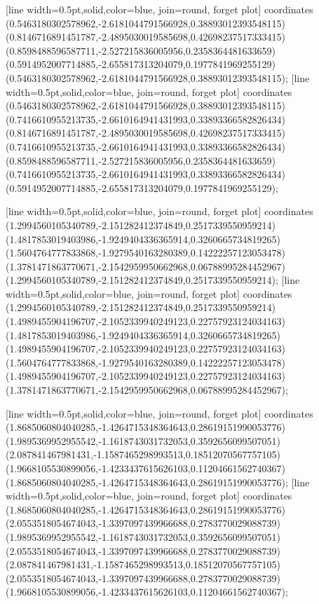 [line width=0.5pt,solid,color=blue, join=round, forget plot] coordinates {(0.5463180302578962,-2.6181044791566928,0.38893012393548115) (0.8146716891451787,-2.4895030019585698,0.42698237517333415) (0.8598488596587711,-2.527215836005956,0.2358364481633659) (0.5914952007714885,-2.655817313204079,0.1977841969255129) (0.5463180302578962,-2.6181044791566928,0.38893012393548115)};
[line width=0.5pt,solid,color=blue, join=round, forget plot] coordinates {(0.5463180302578962,-2.6181044791566928,0.38893012393548115) (0.7416610955213735,-2.6610164941431993,0.33893366582826434) (0.8146716891451787,-2.4895030019585698,0.42698237517333415) (0.7416610955213735,-2.6610164941431993,0.33893366582826434) (0.8598488596587711,-2.527215836005956,0.2358364481633659) (0.7416610955213735,-2.6610164941431993,0.33893366582826434) (0.5914952007714885,-2.655817313204079,0.1977841969255129)};

[line width=0.5pt,solid,color=blue, join=round, forget plot] coordinates {(1.2994560105340789,-2.151282412374849,0.2517339550959214) (1.4817853019403986,-1.9249404336365914,0.3260665734819265) (1.5604764777833868,-1.9279540163280389,0.14222257123053478) (1.3781471863770671,-2.1542959950662968,0.06788995284452967) (1.2994560105340789,-2.151282412374849,0.2517339550959214)};
[line width=0.5pt,solid,color=blue, join=round, forget plot] coordinates {(1.2994560105340789,-2.151282412374849,0.2517339550959214) (1.4989455904196707,-2.1052339940249123,0.22757923124034163) (1.4817853019403986,-1.9249404336365914,0.3260665734819265) (1.4989455904196707,-2.1052339940249123,0.22757923124034163) (1.5604764777833868,-1.9279540163280389,0.14222257123053478) (1.4989455904196707,-2.1052339940249123,0.22757923124034163) (1.3781471863770671,-2.1542959950662968,0.06788995284452967)};

[line width=0.5pt,solid,color=blue, join=round, forget plot] coordinates {(1.8685060804040285,-1.4264715348364643,0.28619151990053776) (1.9895369952955542,-1.1618743031732053,0.3592656099507051) (2.087841467981431,-1.1587465298993513,0.18512070567757105) (1.9668105530899056,-1.4233437615626103,0.11204661562740367) (1.8685060804040285,-1.4264715348364643,0.28619151990053776)};
[line width=0.5pt,solid,color=blue, join=round, forget plot] coordinates {(1.8685060804040285,-1.4264715348364643,0.28619151990053776) (2.0553518054674043,-1.3397097439966688,0.2783770029088739) (1.9895369952955542,-1.1618743031732053,0.3592656099507051) (2.0553518054674043,-1.3397097439966688,0.2783770029088739) (2.087841467981431,-1.1587465298993513,0.18512070567757105) (2.0553518054674043,-1.3397097439966688,0.2783770029088739) (1.9668105530899056,-1.4233437615626103,0.11204661562740367)};

